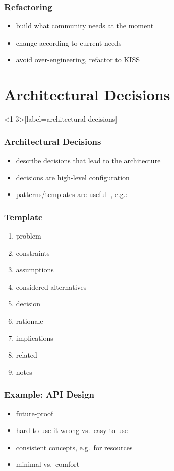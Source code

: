 \begin{frame}
	\frametitle{Refactoring}

	\begin{itemize}
	\item build what community needs at the moment
	\item change according to current needs
	\item avoid over-engineering, refactor to KISS
	\end{itemize}
\end{frame}


\section{Architectural Decisions}

\begin{frame}<1-3>[label=architectural decisions]
	\frametitle{Architectural Decisions}
	\begin{itemize}[<+-| alert@+>]
	\item describe decisions that lead to the architecture
	\item decisions are high-level configuration
	\item patterns/templates are useful~\cite{zdun2007patterns}, e.g.:
	\end{itemize}
\end{frame}

\begin{frame}
	\frametitle{Template}
	\begin{enumerate}[<+-| alert@+>]
	\item problem
	\item constraints
	\item assumptions
	\item considered alternatives
	\item decision
	\item rationale
	\item implications
	\item related
	\item notes
	\end{enumerate}
\end{frame}

\begin{frame}
	\frametitle{Example: API Design}

	\begin{itemize}[<+-| alert@+>]
	\item future-proof
	\item hard to use it wrong vs.\ easy to use
	\item consistent concepts, e.g.\ for resources
	\item minimal vs.\ comfort
	\end{itemize}
\end{frame}

